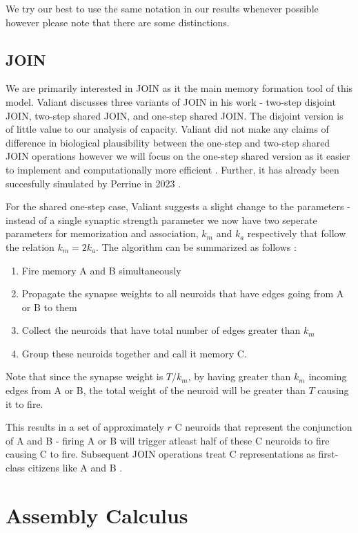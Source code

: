 We try our best to use the same notation in our results whenever possible however please note that there are some distinctions. 

\subsection{JOIN}

We are primarily interested in JOIN as it the main memory formation tool of this model. Valiant discusses three variants of JOIN in his work - two-step disjoint JOIN, two-step shared JOIN, and one-step shared JOIN. The disjoint version is of little value to our analysis of capacity. Valiant did not make any claims of difference in biological plausibility between the one-step and two-step shared JOIN operations however we will focus on the one-step shared version as it easier to implement and computationally more efficient \cite{valiant2005memorization}. Further, it has already been succesfully simulated by Perrine in 2023 \cite{perrine2023neural}. 

For the shared one-step case, Valiant suggests a slight change to the parameters - instead of a single synaptic strength parameter we now have two seperate parameters for memorization and association, $k_m$ and $k_a$ respectively that follow the relation $k_m = 2 k_a$. The algorithm can be summarized as follows \cite{valiant2005memorization}:
\begin{enumerate}
    \item Fire memory A and B simultaneously
    \item Propagate the synapse weights to all neuroids that have edges going from A or B to them
    \item Collect the neuroids that have total number of edges greater than $k_m$
    \item Group these neuroids together and call it memory C. 
\end{enumerate}
Note that since the synapse weight is $T/k_m$, by having greater than $k_m$ incoming edges from A or B, the total weight of the neuroid will be greater than $T$ causing it to fire.  

This results in a set of approximately $r$ C neuroids that represent the conjunction of A and B - firing A or B will trigger atleast half of these C neuroids to fire causing C to fire. Subsequent JOIN operations treat C representations as first-class citizens like A and B \cite{valiant2005memorization}.

\section{Assembly Calculus}

